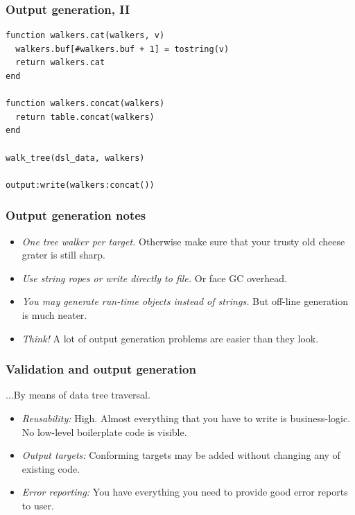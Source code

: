 \documentclass[handout]{beamer}
\begin{document}

\begin{frame}[fragile]

\frametitle{Output generation, II}

\begin{verbatim}
function walkers.cat(walkers, v)
  walkers.buf[#walkers.buf + 1] = tostring(v)
  return walkers.cat
end

function walkers.concat(walkers)
  return table.concat(walkers)
end

walk_tree(dsl_data, walkers)

output:write(walkers:concat())
\end{verbatim}

\end{frame}


\begin{frame}

\frametitle{Output generation notes}

\begin{itemize}
\item \emph{One tree walker per target.} Otherwise make sure that your trusty old cheese grater is still sharp.
\pause
\item \emph{Use string ropes or write directly to file.} Or face GC overhead.
\pause
\item \emph{You may generate run-time objects instead of strings.} But off-line generation is much neater.
\pause
\item \emph{Think!} A lot of output generation problems are easier than they look.
\end{itemize}

\end{frame}


\begin{frame}

\frametitle{Validation and output generation}

...By means of data tree traversal.

\begin{itemize}
\item \emph{Reusability:} High. Almost everything that you have to write is business-logic. No low-level boilerplate code is visible.
\item \emph{Output targets:} Conforming targets may be added without changing any of existing code.
\item \emph{Error reporting:} You have everything you need to provide good error reports to user.
\end{itemize}

\end{frame}
\end{document}
